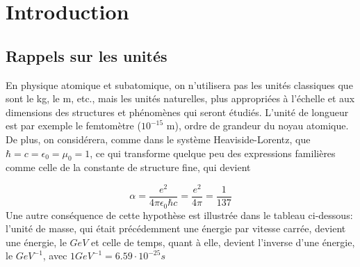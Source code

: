 

\section{Introduction}
\subsection{Rappels sur les unités}

En physique atomique et subatomique, on n'utilisera pas les unités classiques que sont le kg, le m, etc., mais les unités naturelles, plus appropriées à l'échelle et aux dimensions des structures et phénomènes qui seront étudiés. L'unité de longueur est par exemple le femtomètre ($10^{-15}$ m), ordre de grandeur du noyau atomique. De plus, on considérera, comme dans le système Heaviside-Lorentz, que  $\hbar=c=\epsilon_0=\mu_0=1$, ce qui transforme quelque peu des expressions familières comme celle de la constante de structure fine, qui devient 

\[
    \alpha=\dfrac{e^2}{4\pi\epsilon_0\hbar c}=\dfrac{e^2}{4\pi}=\dfrac{1}{137}
\]
Une autre conséquence de cette hypothèse est illustrée dans le tableau ci-dessous: l'unité de masse, qui était précédemment une énergie par vitesse carrée,  devient une énergie, le $GeV$ et celle de temps, quant à elle, devient l'inverse d'une énergie, le $GeV^{-1}$, avec $1 GeV^{-1}=6.59 \cdot 10^{-25}s$

